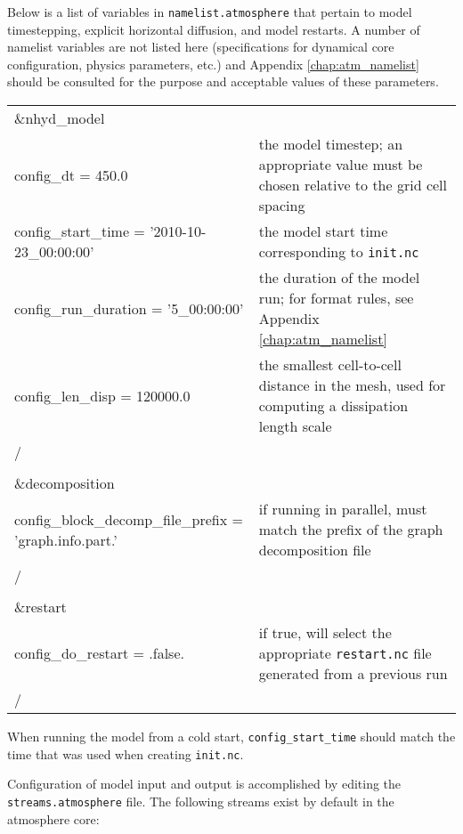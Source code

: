 Below is a list of variables in {\tt namelist.atmosphere} that pertain to model timestepping, explicit horizontal diffusion, and model restarts.  A number of namelist variables are not listed here (specifications for dynamical core configuration, physics parameters, etc.) and Appendix \ref{chap:atm_namelist} should be consulted for the purpose and acceptable values of these parameters.

\begin{longtable}{p{3.0in} |p{3.25in}}

\&nhyd\_model                                        & \\
   config\_dt = 450.0                                & the model timestep; an appropriate value must be chosen relative to the grid cell spacing \\
   config\_start\_time = '2010-10-23\_00:00:00'      & the model start time corresponding to {\tt init.nc}\\
   config\_run\_duration = '5\_00:00:00'             & the duration of the model run; for format rules, see Appendix \ref{chap:atm_namelist} \\
   config\_len\_disp = 120000.0            & the smallest cell-to-cell distance in the mesh, used for computing a dissipation length scale\\
/                                                    & \\
\\
\&decomposition                                            & \\
   config\_block\_decomp\_file\_prefix = 'graph.info.part.' & if running in parallel, must match the prefix of the graph decomposition file \\
/                                                    & \\
\\
\&restart                                            & \\
   config\_do\_restart = .false.                     & if true, will select the appropriate {\tt restart.nc} file generated from a previous run \\
/ 
\end{longtable}

When running the model from a cold start, {\tt config\_start\_time} should match the time that was used when creating {\tt init.nc}.

Configuration of model input and output is accomplished by editing the {\tt streams.atmosphere} file. The following streams exist by default in the atmosphere
core:


